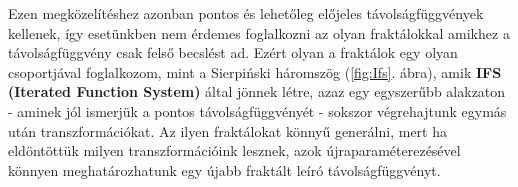 Ezen megközelítéshez azonban pontos és lehetőleg előjeles távolságfüggvények kellenek, így esetünkben nem érdemes foglalkozni az olyan fraktálokkal amikhez a távolságfüggvény csak felső becslést ad. Ezért olyan a fraktálok egy olyan csoportjával foglalkozom, mint a Sierpiński háromszög (\ref{fig:Ifs}. ábra), amik \textbf{IFS (Iterated Function System)}  által jönnek létre, azaz egy egyszerűbb alakzaton - aminek jól ismerjük a pontos távolságfüggvényét - sokszor végrehajtunk egymás után transzformációkat. Az ilyen fraktálokat könnyű generálni, mert ha eldöntöttük milyen transzformációink lesznek, azok újraparaméterezésével könnyen meghatározhatunk egy újabb fraktált leíró távolságfüggvényt.
